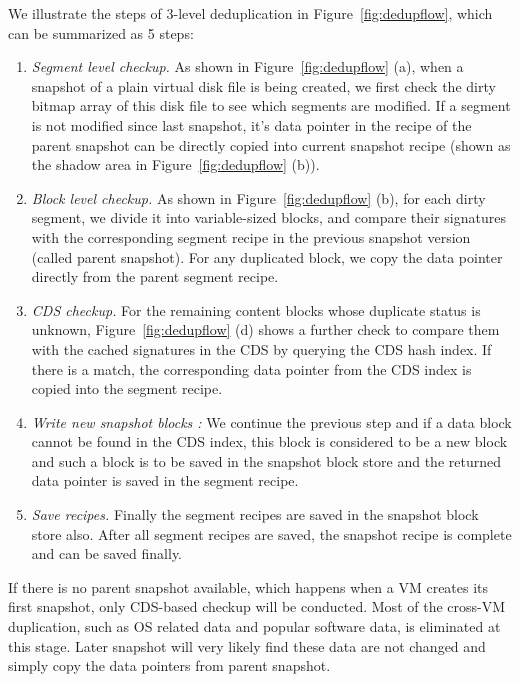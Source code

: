 We illustrate the steps of 3-level deduplication in Figure~\ref{fig:dedupflow}, which can be summarized as 5 steps:
\begin{enumerate}
\item {\em Segment level checkup.}
As shown in Figure~\ref{fig:dedupflow} (a),
when  a snapshot of a plain virtual disk file is being created, we first check the dirty bitmap array of
this disk file  to see which segments are modified. If a segment is not modified since last snapshot, 
it's data pointer in the recipe of the  parent snapshot  can be directly copied into 
current snapshot recipe (shown as the shadow area in Figure~\ref{fig:dedupflow} (b)).

\item {\em Block level checkup.}
As shown in Figure~\ref{fig:dedupflow} (b),
for each dirty segment, we divide it into variable-sized blocks,
and compare their signatures with  the corresponding segment recipe in the previous snapshot version (called parent
snapshot). 
For any duplicated block, we copy the data pointer directly from the parent segment recipe. 
\item {\em CDS checkup.} For the remaining  content blocks whose duplicate status is unknown,
Figure~\ref{fig:dedupflow} (d)
shows  a further check to compare  them with  the cached signatures in the CDS by querying
the CDS hash index. If there is a match, the corresponding data pointer from the CDS index is
copied into the segment recipe. 
\item {\em Write new snapshot blocks :}
We continue the previous step and 
if a data block cannot be found in the CDS index, this block is considered to be a new block
and such a block is to be saved in the snapshot block store and  the returned data pointer is
saved in the  segment recipe.
\item {\em Save recipes.} Finally the  segment recipes are saved in the  snapshot block store also.
 After all segment recipes are saved, the snapshot recipe is complete and can be saved finally.
\end{enumerate}

If there is no parent snapshot available, which happens when a VM creates its first snapshot, 
only CDS-based checkup will be conducted. 
Most of the cross-VM duplication, such as OS related data and popular software data, is eliminated
at this stage. Later snapshot will very likely find these data are not changed and simply copy the data pointers from parent snapshot.
